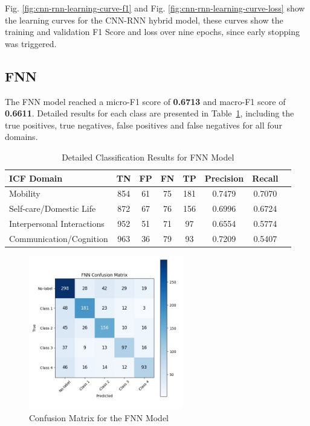 Fig. \ref{fig:cnn-rnn-learning-curve-f1} and Fig. \ref{fig:cnn-rnn-learning-curve-loss} show the learning curves for the CNN-RNN hybrid model, these curves show the training and validation F1 Score and loss over nine epochs, since early stopping was triggered.

\vspace{1em} 
\subsection{FNN}

The FNN model reached a micro-F1 score of \textbf{0.6713} and macro-F1 score of \textbf{0.6611}. Detailed results for each class are presented in Table~\ref{tab:fnn-results}, including the true positives, true negatives, false positives and false negatives for all four domains.

\begin{table}[H]
\centering
\caption{Detailed Classification Results for FNN Model}
\label{tab:fnn-results}
\begin{tabular}{lccccccc}
\toprule
\textbf{ICF Domain} & \textbf{TN} & \textbf{FP} & \textbf{FN} & \textbf{TP} & \textbf{Precision} & \textbf{Recall} \\ 
\midrule
Mobility & 854 & 61 & 75 & 181 & 0.7479 & 0.7070 \\
Self-care/Domestic Life & 872 & 67 & 76 & 156 & 0.6996 & 0.6724 \\
Interpersonal Interactions & 952 & 51 & 71 & 97 & 0.6554 & 0.5774 \\
Communication/Cognition & 963 & 36 & 79 & 93 & 0.7209 & 0.5407 \\
\bottomrule
\end{tabular}
\end{table}

\begin{figure}[H]
\centering
\includegraphics[width=0.6\textwidth]{images/Supervised_Results/FNN_confusion_matrix.jpg}
\caption{Confusion Matrix for the FNN Model}
\label{fig:fnn-confusion}
\end{figure}

